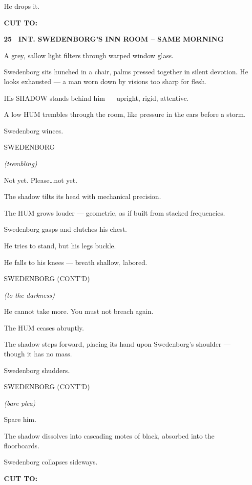 \documentclass[12pt]{article}
\newcommand{\scene}[2]{%
  \vspace{1.8\baselineskip}%
  \noindent\textbf{#1 \ #2}\par\vspace{0.4\baselineskip}%
}
\newenvironment{dialogue}[1]{%
  \vspace{0.8\baselineskip}%
  \noindent\hspace*{2.3in}\textsc{#1}\par%
  \noindent\hspace*{1.5in}\begin{minipage}[t]{4.5in}%
}{%
  \end{minipage}\par%
}
\newcommand{\paren}[1]{%
  \noindent\hspace*{1.8in}\textit{(#1)}\par%
}
\newcommand{\transition}[1]{%
  \vspace{0.6\baselineskip}%
  \begin{flushright}\textbf{#1}\end{flushright}%
}
\begin{document}
He drops it.

\transition{CUT TO:}


\scene{25}{INT. SWEDENBORG'S INN ROOM -- SAME MORNING}

A grey, sallow light filters through warped window glass.

Swedenborg sits hunched in a chair, palms pressed together in silent
devotion. He looks exhausted — a man worn down by visions too sharp for
flesh.

His SHADOW stands behind him — upright, rigid, attentive.

A low HUM trembles through the room, like pressure in the ears before a
storm.

Swedenborg winces.

\begin{dialogue}{SWEDENBORG}
\paren{trembling}
Not yet. Please\ldots not yet.
\end{dialogue}

The shadow tilts its head with mechanical precision.

The HUM grows louder — geometric, as if built from stacked frequencies.

Swedenborg gasps and clutches his chest.

He tries to stand, but his legs buckle.

He falls to his knees — breath shallow, labored.

\begin{dialogue}{SWEDENBORG (CONT'D)}
\paren{to the darkness}
He cannot take more. You must not breach again.
\end{dialogue}

The HUM ceases abruptly.

The shadow steps forward, placing its hand upon Swedenborg’s shoulder —
though it has no mass.

Swedenborg shudders.

\begin{dialogue}{SWEDENBORG (CONT'D)}
\paren{bare plea}
Spare him.
\end{dialogue}

The shadow dissolves into cascading motes of black, absorbed into the
floorboards.

Swedenborg collapses sideways.

\transition{CUT TO:}
\end{document}
